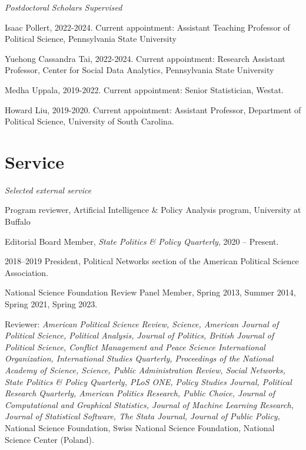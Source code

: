 \documentclass[overlapped,line]{res}
\begin{document}
\begin{resume}
\begin{etaremune}
\end{etaremune}

\vspace{-.2cm}
\hspace{-1cm} \emph{Postdoctoral Scholars Supervised}
\begin{etaremune}
\item Isaac Pollert, 2022-2024. Current appointment: Assistant Teaching Professor of Political Science, Pennsylvania State University
\item Yuehong Cassandra Tai, 2022-2024. Current appointment: Research Assistant Professor, Center for Social Data Analytics, Pennsylvania State University
\item Medha Uppala, 2019-2022. Current appointment: Senior Statistician, Westat.
\item Howard Liu, 2019-2020. Current appointment: Assistant Professor, Department of Political Science, University of South Carolina.

\end{etaremune}

\section{\bf Service}
\vspace{.1cm}
\hspace{-1cm} \emph{Selected external service}
\begin{etaremune}
\item Program reviewer, Artificial Intelligence \& Policy Analysis program, University at Buffalo
\item Editorial Board Member, {\em State Politics \& Policy Quarterly},  2020 -- Present.
\item 2018--2019 President, Political Networks section of the American Political Science Association.
\item National Science Foundation Review Panel Member, Spring 2013, Summer 2014, Spring 2021, Spring 2023.
\item Reviewer: {\em American Political Science Review, Science, American Journal of Political Science, Political Analysis, Journal of Politics, British Journal of Political Science, Conflict Management and Peace Science International Organization, International Studies Quarterly, Proceedings of the National Academy of Science,  Science,  Public Administration Review, Social Networks, State Politics \& Policy Quarterly, PLoS ONE, Policy Studies Journal, Political Research Quarterly, American Politics Research, Public Choice, Journal of Computational and Graphical Statistics, Journal of Machine Learning Research, Journal of Statistical Software, The Stata Journal, Journal of Public Policy}, National Science Foundation, Swiss National Science Foundation, National Science Center (Poland).
\end{etaremune}

\end{resume}
\end{document}
